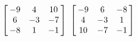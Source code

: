 {$\left[\hskip -3pt \begin{array}{ccc} -9&4&10\\  6&-3&-7
\\  -8&1&-1\end{array}\hskip -3pt \right]$}
{$ \left[\hskip -3pt \begin{array}{ccc} -9&6&-8\\  4&-3&1
\\  10&-7&-1\end{array}\hskip -3pt \right]$}

